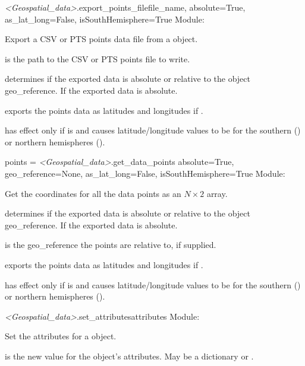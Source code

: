 \documentclass{manual}
\begin{document}
\begin{methoddesc}{\emph{<Geospatial_data>}.export_points_file}{file_name, absolute=True,
                                       as_lat_long=False, isSouthHemisphere=True}
Module: 

Export a CSV or PTS points data file from a  object.

 is the path to the CSV or PTS points file to write.

 determines if the exported data is absolute or relative to the
 object geo_reference.  If  the exported
data is absolute.

 exports the points data as latitudes and longitudes if .

 has effect only if  is  and causes
latitude/longitude values to be for the southern () or northern hemispheres
().
\end{methoddesc}

\begin{methoddesc}{points = \emph{<Geospatial_data>}.get_data_points}
        {absolute=True, geo_reference=None,
         as_lat_long=False, isSouthHemisphere=True}
Module: 

Get the coordinates for all the data points as an $N \times 2$ array.

 determines if the exported data is absolute or relative to the
 object geo_reference.  If  the exported
data is absolute.

 is the geo_reference the points are relative to, if supplied.

 exports the points data as latitudes and longitudes if .

 has effect only if  is  and causes
latitude/longitude values to be for the southern () or northern hemispheres
().
\end{methoddesc}

\begin{methoddesc}{\emph{<Geospatial_data>}.set_attributes}{attributes}
Module: 

Set the attributes for a  object.

 is the new value for the object's attributes.  May be a dictionary or .
\end{methoddesc}
\end{document}
